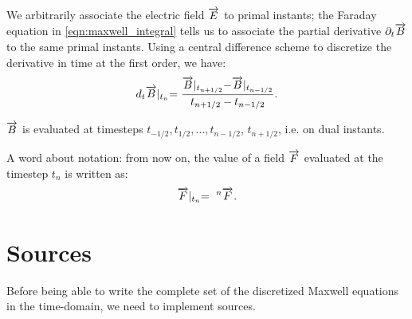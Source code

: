 We arbitrarily associate the electric field $\E$ to primal instants;
the Faraday equation in \eqref{eqn:maxwell_integral} tells us to
associate the partial derivative $\partial_t \B$ to the same primal
instants. Using a central difference scheme to discretize the
derivative in time at the first order, we have:
\begin{equation*}
\dt \Evaluate{\B}{t_n} = \frac{\Evaluate{\B}{t_{n+1/2}} -
\Evaluate{\B}{t_{n-1/2}}}{t_{n+1/2}-t_{n-1/2}}.
\end{equation*}

$\B$ is evaluated at timesteps $t_{-1/2}, t_{1/2}, \dotsc, t_{n-1/2}$,
$t_{n+1/2}$, i.e. on dual instants.

A word about notation: from now on, the value of a field $\Vector{F}$
evaluated at the timestep $t_n$ is written as:
\begin{equation*}
  \Evaluate{\Vector{F}}{t_n} = \Disc{\Vector{F}}{}{n}.
\end{equation*}


\section{Sources}

Before being able to write the complete set of the discretized Maxwell
equations in the time-domain, we need to implement sources.

